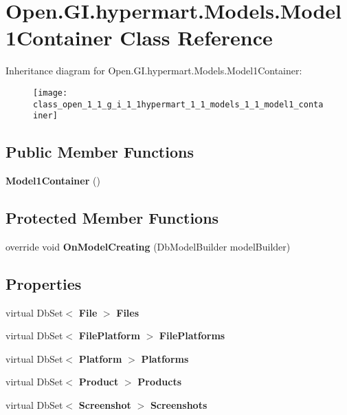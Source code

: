 \section{Open.\+G\+I.\+hypermart.\+Models.\+Model1\+Container Class Reference}
\label{class_open_1_1_g_i_1_1hypermart_1_1_models_1_1_model1_container}
Inheritance diagram for Open.\+G\+I.\+hypermart.\+Models.\+Model1\+Container\+:\begin{figure}[H]
\begin{center}
\leavevmode
\texttt{[image: class\_open\_1\_1\_g\_i\_1\_1hypermart\_1\_1\_models\_1\_1\_model1\_container]}
\end{center}
\end{figure}
\subsection*{Public Member Functions}
\begin{DoxyCompactItemize}
\item 
\textbf{ Model1\+Container} ()
\end{DoxyCompactItemize}
\subsection*{Protected Member Functions}
\begin{DoxyCompactItemize}
\item 
override void \textbf{ On\+Model\+Creating} (Db\+Model\+Builder model\+Builder)
\end{DoxyCompactItemize}
\subsection*{Properties}
\begin{DoxyCompactItemize}
\item 
virtual Db\+Set$<$ \textbf{ File} $>$ \textbf{ Files}\hspace{0.3cm}{\ttfamily  [get, set]}
\item 
virtual Db\+Set$<$ \textbf{ File\+Platform} $>$ \textbf{ File\+Platforms}\hspace{0.3cm}{\ttfamily  [get, set]}
\item 
virtual Db\+Set$<$ \textbf{ Platform} $>$ \textbf{ Platforms}\hspace{0.3cm}{\ttfamily  [get, set]}
\item 
virtual Db\+Set$<$ \textbf{ Product} $>$ \textbf{ Products}\hspace{0.3cm}{\ttfamily  [get, set]}
\item 
virtual Db\+Set$<$ \textbf{ Screenshot} $>$ \textbf{ Screenshots}\hspace{0.3cm}{\ttfamily  [get, set]}
\end{DoxyCompactItemize}


